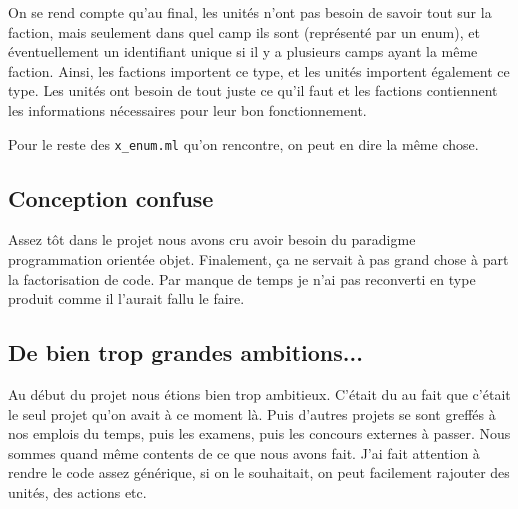 \documentclass{article}
\begin{document}
On se rend compte qu'au final, les unités n'ont pas besoin de savoir tout sur la faction, mais seulement dans quel camp ils sont (représenté par un enum),
et éventuellement un identifiant unique si il y a plusieurs camps ayant la même faction. Ainsi, les factions importent ce type, et 
les unités importent également ce type. Les unités ont besoin de tout juste ce qu'il faut et les factions contiennent les 
informations nécessaires pour leur bon fonctionnement.

Pour le reste des \texttt{x\_enum.ml} qu'on rencontre, on peut en dire la même chose.

\subsection{Conception confuse}
Assez tôt dans le projet nous avons cru avoir besoin du paradigme programmation orientée objet. Finalement,
ça ne servait à pas grand chose à part la factorisation de code. Par manque de temps je n'ai pas
reconverti en type produit comme il l'aurait fallu le faire.

\subsection{De bien trop grandes ambitions...}
Au début du projet nous étions bien trop ambitieux. C'était du au fait que c'était le seul projet qu'on avait à ce moment là. Puis
d'autres projets se sont greffés à nos emplois du temps, puis les examens, puis les concours externes à passer. Nous sommes quand même
contents de ce que nous avons fait. J'ai fait attention à rendre le code assez générique, si on le souhaitait, on peut facilement rajouter des unités,
des actions etc.
\end{document}
